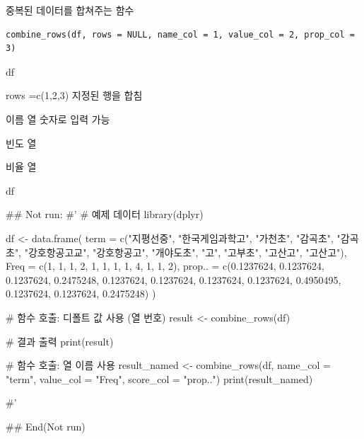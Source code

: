 \documentclass[a4paper]{book}
\begin{document}
%
\begin{Description}
중복된 데이터를 합쳐주는 함수
\end{Description}
%
\begin{Usage}
\begin{verbatim}
combine_rows(df, rows = NULL, name_col = 1, value_col = 2, prop_col = 3)
\end{verbatim}
\end{Usage}
%
\begin{Arguments}
\begin{ldescription}
\item[\code{df}] df

\item[\code{rows}] rows =c(1,2,3) 지정된 행을 합침

\item[\code{name\_col}] 이름 열 숫자로 입력 가능

\item[\code{value\_col}] 빈도 열

\item[\code{prop\_col}] 비율 열
\end{ldescription}
\end{Arguments}
%
\begin{Value}
df
\end{Value}
%
\begin{Examples}
\begin{ExampleCode}
\#\# Not run: 
#'
# 예제 데이터
library(dplyr)

df <- data.frame(
  term = c("지평선중", "한국게임과학고", "가천초", "감곡초", "감곡초",
           "강호항공고교", "강호항공고", "개야도초", "고", "고부초",
           "고산고", "고산고"),
  Freq = c(1, 1, 1, 2, 1, 1, 1, 1, 4, 1, 1, 2),
  prop.. = c(0.1237624, 0.1237624, 0.1237624, 0.2475248, 0.1237624,
             0.1237624, 0.1237624, 0.1237624, 0.4950495, 0.1237624,
             0.1237624, 0.2475248)
)

# 함수 호출: 디폴트 값 사용 (열 번호)
result <- combine_rows(df)

# 결과 출력
print(result)

# 함수 호출: 열 이름 사용
result_named <- combine_rows(df, name_col = "term", value_col = "Freq", score_col = "prop..")
print(result_named)

#'

## End(Not run)
\end{ExampleCode}
\end{Examples}
\end{document}
